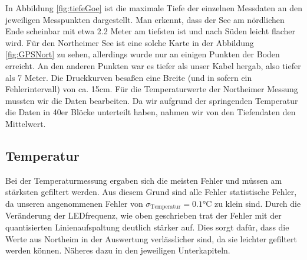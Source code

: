 \documentclass[12pt,a4paper,titlepage,headinclude,bibtotoc]{scrartcl}
\numberwithin{equation}{subsection}
\begin{document}
In Abbildung \ref{fig:tiefeGoe} ist die maximale Tiefe der einzelnen Messdaten an den jeweiligen Messpunkten dargestellt.
Man erkennt, dass der See am nördlichen Ende scheinbar mit etwa 2.2 Meter am tiefsten ist und nach Süden leicht flacher wird.
Für den Northeimer See ist eine solche Karte in der Abbildung \ref{fig:GPSNort} zu sehen, allerdings wurde nur an einigen Punkten der Boden erreicht.
An den anderen Punkten war es tiefer als unser Kabel hergab, also tiefer als 7 Meter.
Die Druckkurven besaßen eine Breite (und in sofern ein Fehlerintervall) von ca. 15cm.
Für die Temperaturwerte der Northeimer Messung mussten wir die Daten bearbeiten.
Da wir aufgrund der springenden Temperatur die Daten in 40er Blöcke unterteilt haben, nahmen wir von den Tiefendaten den Mittelwert.


\subsection{Temperatur}
Bei der Temperaturmessung ergaben sich die meisten Fehler und müssen am stärksten gefiltert werden.
Aus diesem Grund sind alle Fehler statistische Fehler, da unseren angenommenen Fehler von $\sigma_\text{Temperatur}=0.1\si{\celsius}$ zu klein sind.
Durch die Veränderung der LEDfrequenz, wie oben geschrieben trat der Fehler mit der quantisierten Linienaufspaltung deutlich stärker auf.
Dies sorgt dafür, dass die Werte aus Northeim in der Auswertung verlässlicher sind, da sie leichter gefiltert werden können.
Näheres dazu in den jeweiligen Unterkapiteln.
\end{document}
